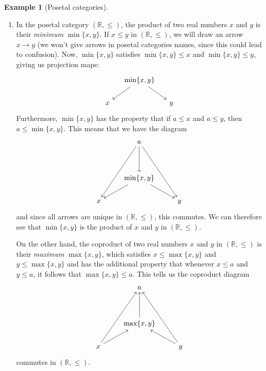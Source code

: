 \documentclass[10pt,oneside]{book}
\newcommand{\R}{\mathbb{R}}
\theoremstyle{plain}
\theoremstyle{definition}
\newtheorem{ex}[thm]{Example}
\theoremstyle{remark}
\numberwithin{equation}{section}
\numberwithin{figure}{section}
\begin{document}
\begin{ex}[Posetal categories]
\hfill
\begin{enumerate}[label=(\roman*)]
    \item In the posetal category $(\R, \leq)$, the product of two real numbers $x$ and $y$ is their \emph{minimum} $\min\{x, y\}$. If $x \leq y$ in $(\R, \leq)$, we will draw an arrow $x \to y$ (we won't give arrows in posetal categories names, since this could lead to confusion). Now, $\min\{x, y\}$ satisfies $\min\{x, y\} \leq x$ and $\min\{x, y\} \leq y$, giving us projection maps:
\[\begin{tikzcd}[column sep=small]
    & {\min\{x, y\}} \\
    x && y
    \arrow[from=1-2, to=2-1]
    \arrow[from=1-2, to=2-3]
\end{tikzcd}\]
Furthermore, $\min\{x, y\}$ has the property that if $a \leq x$ and $a \leq y$, then $a \leq \min\{x, y\}$. This means that we have the diagram
\[
  \begin{tikzcd}
    & a \\
    \\
    & {\min\{x, y\}} \\
    x && y
    \arrow[from=1-2, to=4-1]
    \arrow[from=3-2, to=4-1]
    \arrow[from=1-2, to=4-3]
    \arrow[from=3-2, to=4-3]
    \arrow[from=1-2, to=3-2]
\end{tikzcd}
\]
and since all arrows are unique in $(\R, \leq)$, this commutes. We can therefore see that $\min\{x, y\}$ is the product of $x$ and $y$ in $(\R, \leq)$.

On the other hand, the coproduct of two real numbers $x$ and $y$ in $(\R, \leq)$ is their \emph{maximum} $\max\{x, y\}$, which satisfies $x \leq \max\{x, y\}$ and $y \leq \max\{x, y\}$ and has the additional property that whenever $x \leq a$ and $y \leq a$, it follows that $\max\{x, y\} \leq a$. This tells us the coproduct diagram
\[\begin{tikzcd}
    & a \\
    \\
    & {\max\{x, y\}} \\
    x && y
    \arrow[from=4-1, to=3-2]
    \arrow[from=4-3, to=3-2]
    \arrow[from=3-2, to=1-2]
    \arrow[from=4-1, to=1-2]
    \arrow[from=4-3, to=1-2]
\end{tikzcd}\]
commutes in $(\R, \leq)$.


\end{enumerate}
\end{ex}
\end{document}
